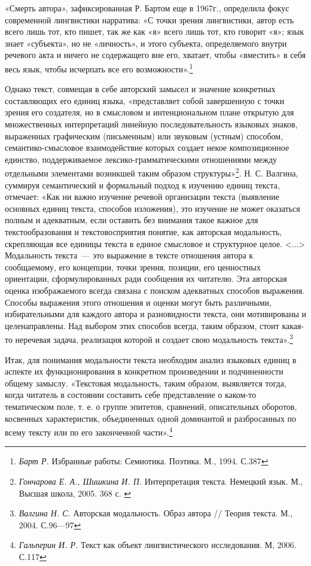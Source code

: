\documentclass{kursa4}
\begin{document}
{      «Смерть автора», зафиксированная Р. Бартом еще в 1967г., определила фокус современной лингвистики нарратива:\newline
      «С точки зрения лингвистики, автор есть всего лишь тот, кто пишет, так же как «я» всего лишь тот, кто говорит «я»; язык знает «субъекта», но не «личность», и этого субъекта, определяемого внутри речевого акта и ничего не содержащего вне его, хватает, чтобы «вместить» в себя весь язык, чтобы исчерпать все его возможности».\footnote{\textit{{Барт Р.}}{ Избранные работы: Семиотика. Поэтика. М., 1994. С.387}}

      Однако текст, совмещая в себе авторский замысел и значение конкретных составляющих его единиц языка, «представляет собой завершенную с точки зрения его создателя, но в смысловом и интенциональном плане открытую для множественных интерпретаций линейную последовательность языковых знаков, выраженных графическим (письменным) или звуковым (устным) способом, семантико-смысловое взаимодействие которых создает некое композиционное единство, поддерживаемое лексико-грамматическими отношениями между отдельными элементами возникшей таким образом структуры»\footnote{\textit{{Гончарова Е. А., Шишкина И. П. }}{Интерпретация текста. Немецкий язык. М., Высшая школа, 2005. 368 с. }}. Н. С. Валгина, суммируя семантический и формальный подход к изучению единиц текста, отмечает: «Как ни важно изучение речевой организации текста (выявление основных единиц текста, способов изложения), это изучение не может оказаться полным и адекватным, если оставить без внимания такое важное для текстообразования и текстовосприятия понятие, как авторская модальность, скрепляющая все единицы текста в единое смысловое и структурное целое. \textless{}...\textgreater{} Модальность текста~--- это выражение в тексте отношения автора к сообщаемому, его концепции, точки зрения, позиции, его ценностных ориентации, сформулированных ради сообщения их читателю. Эта авторская оценка изображаемого всегда связана с поиском адекватных способов выражения. Способы выражения этого отношения и оценки могут быть различными, избирательными для каждого автора и разновидности текста, они мотивированы и целенаправлены. Над выбором этих способов всегда, таким образом, стоит какая-то неречевая задача, реализация которой и создает свою модальность текста».\footnote{\textit{{Валгина Н. С. }}{Авторская модальность. Образ автора // Теория текста. М., 2004. С.96—97}} 

      Итак, для понимания модальности текста необходим анализ языковых единиц в аспекте их функционирования в конкретном произведении и подчиненности общему замыслу. «{Текстовая модальность, таким образом, выявляется тогда, когда читатель в состоянии составить себе представление о каком-то тематическом поле, т. е. о группе эпитетов, сравнений, описательных оборотов, косвенных характеристик, объединенных одной доминантой и разбросанных по всему тексту или по его законченной части».}\footnote{\textit{{Гальперин И. Р. }}{Текст как объект лингвистического исследования. М, 2006. С.117}}{ }

}
\end{document}
